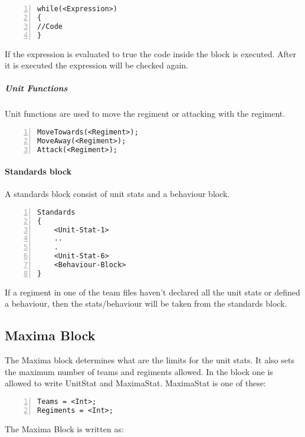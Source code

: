 		\begin{lstlisting}[basicstyle=\small\sffamily,
		keywordstyle={\color{blue}},
		comment={[l]{//}}, morecomment={[s]{/*}{*/}}, commentstyle=\itshape,
		columns={[l]flexible}, numbers=left, numberstyle=\tiny,
		frameround=fftt, frame=shadowbox, captionpos=b,
		caption={While loop}]
while(<Expression>)
{
//Code
}
			\end{lstlisting}
			If the expression is evaluated to true the code inside the block is executed. After it is executed the expression will be checked again.
		\subparagraph{Unit Functions}
			Unit functions are used to move the regiment or attacking with the regiment.

		\begin{lstlisting}[basicstyle=\small\sffamily,
		keywordstyle={\color{blue}},
		comment={[l]{//}}, morecomment={[s]{/*}{*/}}, commentstyle=\itshape,
		columns={[l]flexible}, numbers=left, numberstyle=\tiny,
		frameround=fftt, frame=shadowbox, captionpos=b,
		caption={Unit functions}]
MoveTowards(<Regiment>);
MoveAway(<Regiment>);
Attack(<Regiment>);
			\end{lstlisting}
	\paragraph{Standards block}
		A standards block consist of unit stats and a behaviour block. 

		\begin{lstlisting}[basicstyle=\small\sffamily,
		keywordstyle={\color{blue}},
		comment={[l]{//}}, morecomment={[s]{/*}{*/}}, commentstyle=\itshape,
		columns={[l]flexible}, numbers=left, numberstyle=\tiny,
		frameround=fftt, frame=shadowbox, captionpos=b,
		caption={Standards block}]
Standards
{
	<Unit-Stat-1>
	..
	.
	<Unit-Stat-6>
	<Behaviour-Block>
}
		\end{lstlisting}
		If a regiment in one of the team files haven't declared all the unit stats
		or defined a behaviour, then the stats/behaviour will be taken from the standards block.
	\subsection{Maxima Block}
		The Maxima block determines what are the limits for the unit stats. It also sets the maximum number of teams and regiments allowed.
		In the block one is allowed to write UnitStat and MaximaStat.
		MaximaStat is one of these:

		\begin{lstlisting}[basicstyle=\small\sffamily,
		keywordstyle={\color{blue}},
		comment={[l]{//}}, morecomment={[s]{/*}{*/}}, commentstyle=\itshape,
		columns={[l]flexible}, numbers=left, numberstyle=\tiny,
		frameround=fftt, frame=shadowbox, captionpos=b,
		caption={Maxima block}]
Teams = <Int>;
Regiments = <Int>;
		\end{lstlisting}
		The Maxima Block is written as:

